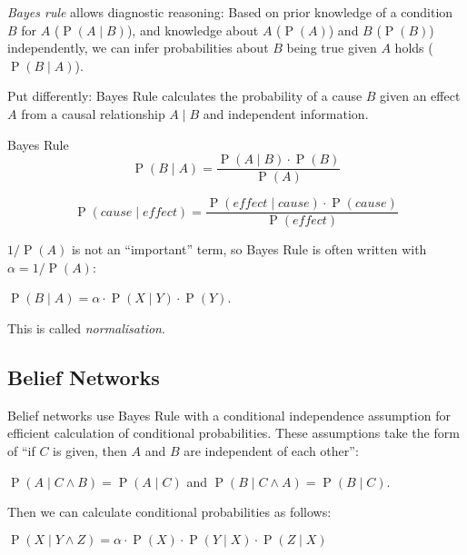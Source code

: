 \documentclass[english]{panikzettel}
\begin{document}
\begin{halfboxl}
\emph{Bayes rule} allows diagnostic reasoning:  Based on prior knowledge of a condition $B$ for $A$ (${\operatorname{P}(A \mid B)}$), and knowledge about $A$ ($\operatorname{P}(A)$) and $B$ ($\operatorname{P}(B)$) independently, we can infer probabilities about $B$ being true given $A$ holds ($\operatorname{P}(B \mid A)$).

Put differently: Bayes Rule calculates the probability of a cause $B$ given an effect $A$ from a causal relationship $A \mid B$ and independent information.
\end{halfboxl}%
\begin{halfboxr}
\vspace{-\baselineskip}
\begin{theo}{Bayes Rule}
\[\operatorname{P}(B\mid A) = \frac{\operatorname{P} (A\mid B) \cdot \operatorname{P}(B)} {\operatorname{P}(A)}\]

\footnotesize
\[\operatorname{P}(cause \mid effect) = \frac{\operatorname{P} (effect \mid cause) \cdot \operatorname{P}(cause)} {\operatorname{P}(effect)}\]
\end{theo}
\end{halfboxr}

$1/\operatorname{P}(A)$ is not an ``important'' term, so Bayes Rule is often written with $\alpha = 1/\operatorname{P}(A)$:
\begin{tightcenter}
$\operatorname{P}(B \mid A) = \alpha \cdot \operatorname{P}(X \mid Y) \cdot \operatorname{P}(Y)$.
\end{tightcenter}
This is called \emph{normalisation}.

\subsection{Belief Networks}

Belief networks use Bayes Rule with a conditional independence assumption for efficient calculation of conditional probabilities.
These assumptions take the form of ``if $C$ is given, then $A$ and $B$ are independent of each other'':
\begin{tightcenter}
$\operatorname{P}(A \mid C \land B) = \operatorname{P}(A \mid C)$ and $\operatorname{P}(B \mid C \land A) = \operatorname{P}(B \mid C)$.
\end{tightcenter}
Then we can calculate conditional probabilities as follows:
\begin{tightcenter}
$\operatorname{P}(X \mid Y \land Z) = \alpha \cdot \operatorname{P}(X) \cdot \operatorname{P}(Y \mid X) \cdot \operatorname{P}(Z \mid X)$
\end{tightcenter}
\bigskip
\end{document}
